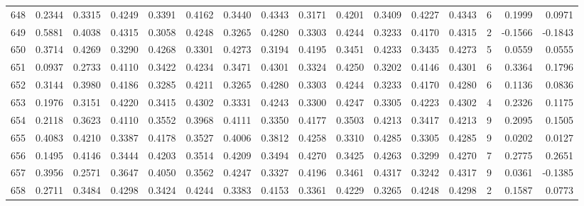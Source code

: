 \begin{tabular}{lrrrrrrrrrrrrrrr}
648 &      0.2344 &  0.3315 &  0.4249 &  0.3391 &  0.4162 &  0.3440 &  0.4343 &  0.3171 &  0.4201 &  0.3409 &   0.4227 &     0.4343 &      6 &                    0.1999 &                     0.0971 \\
649 &      0.5881 &  0.4038 &  0.4315 &  0.3058 &  0.4248 &  0.3265 &  0.4280 &  0.3303 &  0.4244 &  0.3233 &   0.4170 &     0.4315 &      2 &                   -0.1566 &                    -0.1843 \\
650 &      0.3714 &  0.4269 &  0.3290 &  0.4268 &  0.3301 &  0.4273 &  0.3194 &  0.4195 &  0.3451 &  0.4233 &   0.3435 &     0.4273 &      5 &                    0.0559 &                     0.0555 \\
651 &      0.0937 &  0.2733 &  0.4110 &  0.3422 &  0.4234 &  0.3471 &  0.4301 &  0.3324 &  0.4250 &  0.3202 &   0.4146 &     0.4301 &      6 &                    0.3364 &                     0.1796 \\
652 &      0.3144 &  0.3980 &  0.4186 &  0.3285 &  0.4211 &  0.3265 &  0.4280 &  0.3303 &  0.4244 &  0.3233 &   0.4170 &     0.4280 &      6 &                    0.1136 &                     0.0836 \\
653 &      0.1976 &  0.3151 &  0.4220 &  0.3415 &  0.4302 &  0.3331 &  0.4243 &  0.3300 &  0.4247 &  0.3305 &   0.4223 &     0.4302 &      4 &                    0.2326 &                     0.1175 \\
654 &      0.2118 &  0.3623 &  0.4110 &  0.3552 &  0.3968 &  0.4111 &  0.3350 &  0.4177 &  0.3503 &  0.4213 &   0.3417 &     0.4213 &      9 &                    0.2095 &                     0.1505 \\
655 &      0.4083 &  0.4210 &  0.3387 &  0.4178 &  0.3527 &  0.4006 &  0.3812 &  0.4258 &  0.3310 &  0.4285 &   0.3305 &     0.4285 &      9 &                    0.0202 &                     0.0127 \\
656 &      0.1495 &  0.4146 &  0.3444 &  0.4203 &  0.3514 &  0.4209 &  0.3494 &  0.4270 &  0.3425 &  0.4263 &   0.3299 &     0.4270 &      7 &                    0.2775 &                     0.2651 \\
657 &      0.3956 &  0.2571 &  0.3647 &  0.4050 &  0.3562 &  0.4247 &  0.3327 &  0.4196 &  0.3461 &  0.4317 &   0.3242 &     0.4317 &      9 &                    0.0361 &                    -0.1385 \\
658 &      0.2711 &  0.3484 &  0.4298 &  0.3424 &  0.4244 &  0.3383 &  0.4153 &  0.3361 &  0.4229 &  0.3265 &   0.4248 &     0.4298 &      2 &                    0.1587 &                     0.0773 \\

\end{tabular}

